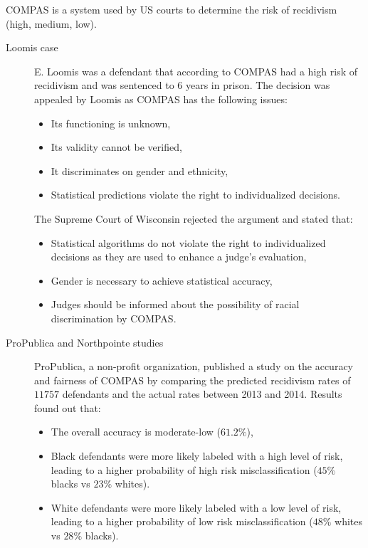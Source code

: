 \begin{example}
    COMPAS is a system used by US courts to determine the risk of recidivism (high, medium, low).

    \begin{description}
        \item[Loomis case]
            E. Loomis was a defendant that according to COMPAS had a high risk of recidivism and was sentenced to 6 years in prison. The decision was appealed by Loomis as COMPAS has the following issues:
            \begin{itemize}
                \item Its functioning is unknown,
                \item Its validity cannot be verified,
                \item It discriminates on gender and ethnicity,
                \item Statistical predictions violate the right to individualized decisions.
            \end{itemize}

            The Supreme Court of Wisconsin rejected the argument and stated that:
            \begin{itemize}
                \item Statistical algorithms do not violate the right to individualized decisions as they are used to enhance a judge's evaluation,
                \item Gender is necessary to achieve statistical accuracy,
                \item Judges should be informed about the possibility of racial discrimination by COMPAS.
            \end{itemize}

        \item[ProPublica and Northpointe studies]
            ProPublica, a non-profit organization, published a study on the accuracy and fairness of COMPAS by comparing the predicted recidivism rates of $\num{11757}$ defendants and the actual rates between 2013 and 2014. Results found out that:
            \begin{itemize}
                \item The overall accuracy is moderate-low ($61.2\%$),
                \item Black defendants were more likely labeled with a high level of risk, leading to a higher probability of high risk misclassification ($45\%$ blacks vs $23\%$ whites).
                \item White defendants were more likely labeled with a low level of risk, leading to a higher probability of low risk misclassification ($48\%$ whites vs $28\%$ blacks).
            \end{itemize}


\end{description}
\end{example}

